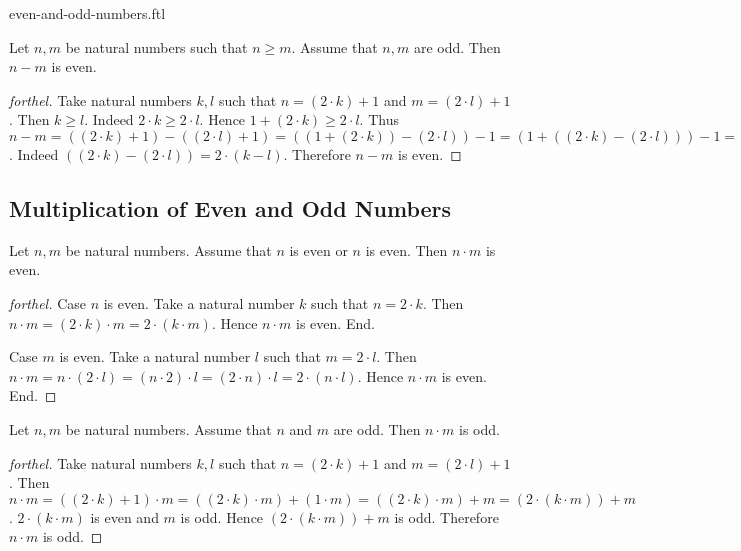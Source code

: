 \documentclass{naproche-library}
\begin{document}
\begin{smodule}{even-and-odd-numbers.ftl}
  \begin{proposition}[forthel,id=ARITHMETIC_15_0125478854587412,printid]
    Let $n, m$ be natural numbers such that $n \geq m$.
    Assume that $n, m$ are odd.
    Then $n - m$ is even.
  \end{proposition}
  \begin{proof}[forthel]
    Take natural numbers $k, l$ such that $n = (2 \cdot k) + 1$ and $m = (2 \cdot l) + 1$.
    Then $k \geq l$.
    Indeed $2 \cdot k \geq 2 \cdot l$.
    Hence $1 + (2 \cdot k) \geq 2 \cdot l$.
    Thus $n - m
      = ((2 \cdot k) + 1) - ((2 \cdot l) + 1)
      = ((1 + (2 \cdot k)) - (2 \cdot l)) - 1
      = (1 + ((2 \cdot k) - (2 \cdot l))) - 1
      = (1 + (2 \cdot (k - l))) - 1
      = ((2 \cdot (k - l)) + 1) - 1
      = 2 \cdot (k - l)$.
    Indeed $((2 \cdot k) - (2 \cdot l)) = 2 \cdot (k - l)$. %
    Therefore $n - m$ is even.
  \end{proof}


  \subsection*{Multiplication of Even and Odd Numbers}

  \begin{proposition}[forthel,id=ARITHMETIC_15_0125698547589652,printid]
    Let $n, m$ be natural numbers.
    Assume that $n$ is even or $n$ is even.
    Then $n \cdot m$ is even.
  \end{proposition}
  \begin{proof}[forthel]
    Case $n$ is even.
      Take a natural number $k$ such that $n = 2 \cdot k$.
      Then $n \cdot m
        = (2 \cdot k) \cdot m
        = 2 \cdot (k \cdot m)$.
      Hence $n \cdot m$ is even.
    End.

    Case $m$ is even.
      Take a natural number $l$ such that $m = 2 \cdot l$.
      Then $n \cdot m
        = n \cdot (2 \cdot l)
        = (n \cdot 2) \cdot l
        = (2 \cdot n) \cdot l
        = 2 \cdot (n \cdot l)$.
      Hence $n \cdot m$ is even.
    End.
  \end{proof}

  \begin{proposition}[forthel,id=ARITHMETIC_15_0236596587452145,printid]
    Let $n, m$ be natural numbers.
    Assume that $n$ and $m$ are odd.
    Then $n \cdot m$ is odd.
  \end{proposition}
  \begin{proof}[forthel]
    Take natural numbers $k, l$ such that $n = (2 \cdot k) + 1$ and $m = (2 \cdot l) + 1$.
    Then $n \cdot m
      = ((2 \cdot k) + 1) \cdot m
      = ((2 \cdot k) \cdot m) + (1 \cdot m)
      = ((2 \cdot k) \cdot m) + m
      = (2 \cdot (k \cdot m)) + m$.
    $2 \cdot (k \cdot m)$ is even and $m$ is odd.
    Hence $(2 \cdot (k \cdot m)) + m$ is odd.
    Therefore $n \cdot m$ is odd.
  \end{proof}
\end{smodule}
\end{document}
